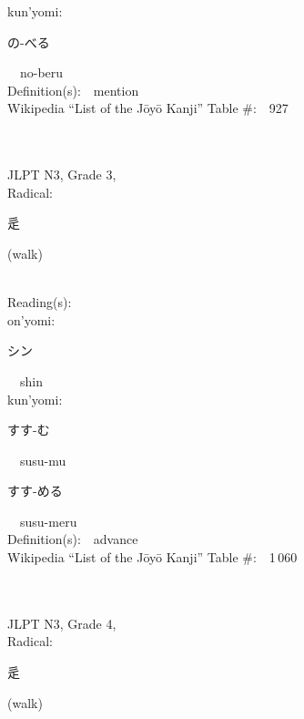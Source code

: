 \begin{multicols}{2}
{\hspace*{1em}}kun'yomi:\ \ \\
{\hspace*{2em}}{\begin{CJK}{UTF8}{min} の-べる \end{CJK}}\ \ no-beru\ \ \\
Definition(s):\ \ mention \\
Wikipedia ``List of the J\=oy\=o Kanji'' Table \#:\ \ 927 \\
\ \ \\
{\fontsize{34pt}{40pt}  }\ \ \\  %
{JLPT N3, Grade 3, \\Radical:\ \ {\begin{CJK}{UTF8}{min} 辵 \end{CJK}} (walk) } \\
Reading(s):\ \ \\
{\hspace*{1em}}on'yomi:\ \ \\
{\hspace*{2em}}{\begin{CJK}{UTF8}{min} シン \end{CJK}}\ \ shin\ \ \\
{\hspace*{1em}}kun'yomi:\ \ \\
{\hspace*{2em}}{\begin{CJK}{UTF8}{min} すす-む \end{CJK}}\ \ susu-mu\ \ \\
{\hspace*{2em}}{\begin{CJK}{UTF8}{min} すす-める \end{CJK}}\ \ susu-meru\ \ \\
Definition(s):\ \ advance \\
Wikipedia ``List of the J\=oy\=o Kanji'' Table \#:\ \ 1\,060 \\
\ \ \\
{\fontsize{34pt}{40pt}  }\ \ \\  %
{JLPT N3, Grade 4, \\Radical:\ \ {\begin{CJK}{UTF8}{min} 辵 \end{CJK}} (walk) } \\

\end{multicols}
